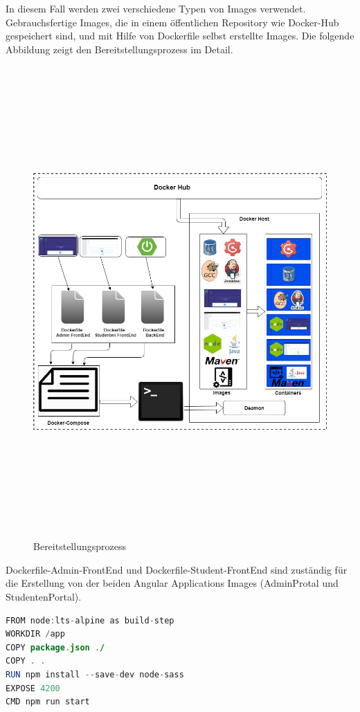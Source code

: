 \documentclass[a4paper,12pt,oneside]{book}
\begin{document}
\newline
In diesem Fall werden zwei verschiedene Typen von Images verwendet. Gebrauchsfertige Images, die in einem öffentlichen Repository wie Docker-Hub gespeichert sind, und mit Hilfe von Dockerfile selbst erstellte Images.
\newline
Die folgende Abbildung zeigt den Bereitstellungsprozess im Detail.
\newpage
\begin{figure}[h!]
	\begin{center}
		\includegraphics[width=16cm, height=18cm]{Application-deployment.jpg}
		\caption{Bereitstellungsprozess} 
		\label{Bereitstellungsprozess} 
	\end{center}
\end{figure}
\newpage
Dockerfile-Admin-FrontEnd und Dockerfile-Student-FrontEnd sind zuständig für die Erstellung von der beiden Angular Applications Images (AdminProtal und StudentenPortal).
\begin{lstlisting}[language=JAVA,caption=Dockerfile für Angular Application]
FROM node:lts-alpine as build-step
WORKDIR /app
COPY package.json ./
COPY . .
RUN npm install --save-dev node-sass
EXPOSE 4200
CMD npm run start
\end{lstlisting}
\end{document}
